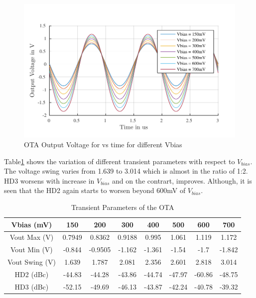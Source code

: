 \begin{figure} [H]
\centering
\includegraphics[scale=1]{Figures/Plots/OTA_Sine.pdf}
\caption{OTA Output Voltage for vs time for different Vbias}
\label{fig:OTA_Sine}
\end{figure}

Table\ref{tab:OTA_Sine_Params} shows the variation of different transient parameters with respect to $V_{bias}$. The voltage swing varies from 1.639 to 3.014 which is almost in the ratio of 1:2. HD3 worsens with increase in $V_{bias}$ and on the contrart, improves. Although, it is seen that the HD2 again starts to worsen beyond 600mV of $V_{bias}$.

\begin{table} [H]
\centering
\begin{tabular}{@{}cccccccc@{}}
\toprule
Vbias (mV)					& 150			& 200			& 300			& 400			& 500			& 600			& 700 \\ \midrule
Vout Max (V)			& 0.7949		& 0.8362		& 0.9188		& 0.995		& 1.061		& 1.119		& 1.172 \\
Vout Min (V)			& -0.844		& -0.9505		& -1.162		& -1.361		& -1.54		& -1.7		& -1.842 \\
Vout Swing (V)				& 1.639		& 1.787		& 2.081		& 2.356		& 2.601		& 2.818		& 3.014 \\
HD2 (dBc) 				& -44.83		& -44.28		& -43.86		& -44.74		& -47.97		& -60.86		& -48.75 \\
HD3 (dBc) 				& -52.15		& -49.69		& -46.13		& -43.87		& -42.24		& -40.78		& -39.32 \\
\bottomrule
\end{tabular}
\caption{Transient Parameters of the OTA}
\label{tab:OTA_Sine_Params}
\end{table}

